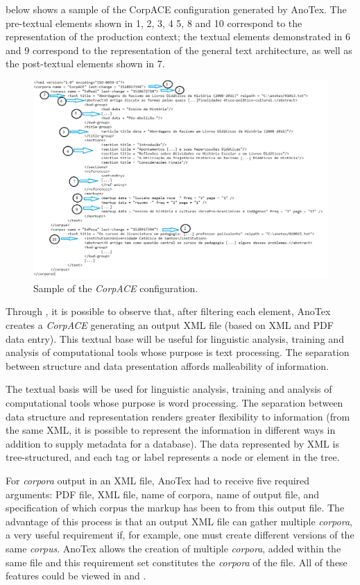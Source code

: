 \documentclass[english]{textolivre}
\begin{document}
 below shows a sample of the CorpACE configuration generated by AnoTex. The pre-textual elements shown in 1, 2, 3, 4 5, 8 and 10 correspond to the representation of the production context; the textual elements demonstrated in 6 and 9 correspond to the representation of the general text architecture, as well as the post-textual elements shown in 7.

\begin{figure}[htbp]
 \centering
 \includegraphics[width=\textwidth]{Fig5.png}
 \caption{Sample of the \textit{CorpACE} configuration.}
 \label{fig-05}
\end{figure}

Through , it is possible to observe that, after filtering each element, AnoTex creates a \textit{CorpACE} generating an output XML file (based on XML and PDF data entry). This textual base will be useful for linguistic analysis, training and analysis of computational tools whose purpose is text processing. The separation between structure and data presentation affords malleability of information.

The textual basis will be used for linguistic analysis, training and analysis of computational tools whose purpose is word processing. The separation between data structure and representation renders greater flexibility to information (from the same XML, it is possible to represent the information in different ways in addition to supply metadata for a database). The data represented by XML is tree-structured, and each tag or label represents a node or element in the tree.

For \textit{corpora} output in an XML file, AnoTex had to receive five required arguments: PDF file, XML file, name of corpora, name of output file, and specification of which corpus the markup has been to from this output file. The advantage of this process is that an output XML file can gather multiple \textit{corpora}, a very useful requirement if, for example, one must create different versions of the same \textit{corpus}. AnoTex allows the creation of multiple \textit{corpora}, added within the same file and this requirement set constitutes the \textit{corpora} of the file. All of these features could be viewed in  and .
\end{document}

